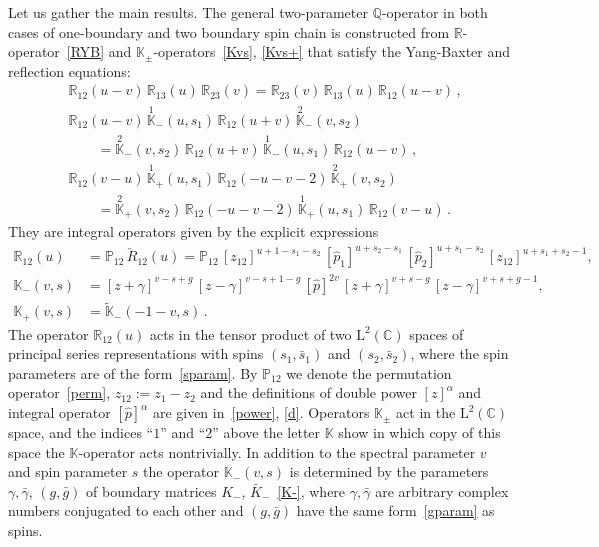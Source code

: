 \documentclass[a4paper,11pt]{article}
\numberwithin{equation}{section}
\begin{document}
Let us gather the main results.
The general two-parameter $\mathbb{Q}$-operator in both cases of one-boundary and two boundary spin chain is constructed from $\mathbb{R}$-operator~\eqref{RYB} and $\mathbb{K}_{\pm}$-operators~\eqref{Kvs}, \eqref{Kvs+} that satisfy the Yang-Baxter and reflection equations:
\begin{align*}
	&\mathbb{R}_{12}(u-v)\,\mathbb{R}_{13}(u)\,\mathbb{R}_{23}(v) = \mathbb{R}_{23}(v)\,\mathbb{R}_{13}(u)\,\mathbb{R}_{12}(u-v) \,, \\[0.5em]
	&\mathbb{R}_{12}(u-v)\,\overset{1}{\mathbb{K}}_-(u,s_1)\,\mathbb{R}_{12}(u+v)\,\overset{2}{\mathbb{K}}_-(v,s_2) \\
	&\qquad = \overset{2}{\mathbb{K}}_-(v,s_2)\,\mathbb{R}_{12}(u+v)\,\overset{1}{\mathbb{K}}_-(u,s_1)\,\mathbb{R}_{12}(u-v) \,, \\[0.5em]
	&\mathbb{R}_{12}(v-u)\,\overset{1}{\mathbb{K}}_+(u,s_1)\,\mathbb{R}_{12}(-u-v-2)\,\overset{2}{\mathbb{K}}_+(v,s_2) \\
	&\qquad = \overset{2}{\mathbb{K}}_+(v,s_2)\,\mathbb{R}_{12}(-u-v-2)\,\overset{1}{\mathbb{K}}_+(u,s_1)\,\mathbb{R}_{12}(v-u) \,.
\end{align*}
They are integral operators given by the explicit expressions
\begin{align*}
	\mathbb{R}_{12}(u) &= \mathbb{P}_{12}\,\check{R}_{12}(u) = \mathbb{P}_{12}\,[z_{12}]^{u+1-s_1-s_2}\,[\hat{p}_1]^{u+s_2-s_1}\,[\hat{p}_2]^{u+s_1-s_2}\,[z_{12}]^{u+s_1+s_2-1} , \\[0.6em]
	\mathbb{K}_-(v,s) &= [z+\gamma]^{v-s+g}\,[z-\gamma]^{v-s+1-g}\,[\hat{p}]^{2v}\,[z+\gamma]^{v+s-g}\,[z-\gamma]^{v+s+g-1} , \\[0.6em]
	\mathbb{K}_+(v,s) &= \tilde{\mathbb{K}}_-(-1-v,s) \,.
\end{align*}
The operator $\mathbb{R}_{12}(u)$ acts in the tensor product of two $\mathrm{L}^2(\mathbb{C})$ spaces of principal series representations with spins $(s_1,\bar{s}_1)$ and $(s_2,\bar{s}_2)$, where the spin parameters are of the form~\eqref{sparam}.
By $\mathbb{P}_{12}$ we denote the permutation operator~\eqref{perm}, $z_{12} :=z_1-z_2$ and the definitions of double power $[z]^\alpha$ and integral operator $[\hat{p}]^\alpha$ are given in~\eqref{power}, \eqref{d}.
Operators $\mathbb{K}_\pm$ act in the $\mathrm{L}^2(\mathbb{C})$ space, and the indices ``$1$'' and ``$2$'' above the letter $\mathbb{K}$ show in which copy of this space the $\mathbb{K}$-operator acts nontrivially.
In addition to the spectral parameter $v$ and spin parameter $s$ the operator $\mathbb{K}_-(v,s)$ is determined by the parameters $\gamma, \bar{\gamma}$, $(g,\bar{g})$ of boundary matrices $K_-$, $\bar{K}_-$~\eqref{K-}, where $\gamma, \bar{\gamma}$ are arbitrary complex numbers conjugated to each other and $(g,\bar{g})$ have the same form~\eqref{gparam} as spins.
\end{document}
